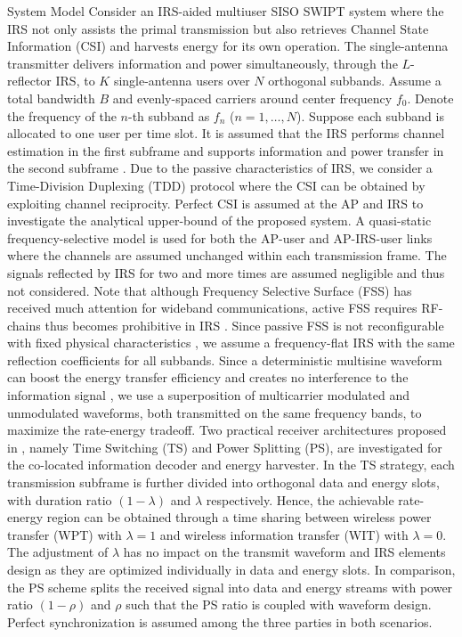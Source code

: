 \documentclass{IEEEtran}
\begin{document}
\begin{section}{System Model}
	Consider an IRS-aided multiuser SISO SWIPT system where the IRS not only assists the primal transmission but also retrieves Channel State Information (CSI) and harvests energy for its own operation. The single-antenna transmitter delivers information and power simultaneously, through the $L$-reflector IRS, to $K$ single-antenna users over $N$ orthogonal subbands. Assume a total bandwidth $B$ and evenly-spaced carriers around center frequency $f_0$. Denote the frequency of the $n$-th subband as $f_n$ ($n=1,\dots,N$). Suppose each subband is allocated to one user per time slot. It is assumed that the IRS performs channel estimation in the first subframe and supports information and power transfer in the second subframe \cite{Zheng2019}. Due to the passive characteristics of IRS, we consider a Time-Division Duplexing (TDD) protocol where the CSI can be obtained by exploiting channel reciprocity. Perfect CSI is assumed at the AP and IRS to investigate the analytical upper-bound of the proposed system. A quasi-static frequency-selective model is used for both the AP-user and AP-IRS-user links where the channels are assumed unchanged within each transmission frame. The signals reflected by IRS for two and more times are assumed negligible and thus not considered. Note that although Frequency Selective Surface (FSS) has received much attention for wideband communications, active FSS requires RF-chains thus becomes prohibitive in IRS \cite{Kim2006,Xu2014}. Since passive FSS is not reconfigurable with fixed physical characteristics \cite{Anwar2018}, we assume a frequency-flat IRS with the same reflection coefficients for all subbands. Since a deterministic multisine waveform can boost the energy transfer efficiency \cite{Clerckx2016a} and creates no interference to the information signal \cite{Clerckx2018b}, we use a superposition of multicarrier modulated and unmodulated waveforms, both transmitted on the same frequency bands, to maximize the rate-energy tradeoff. Two practical receiver architectures proposed in \cite{Zhang2013}, namely Time Switching (TS) and Power Splitting (PS), are investigated for the co-located information decoder and energy harvester. In the TS strategy, each transmission subframe is further divided into orthogonal data and energy slots, with duration ratio $(1-\lambda)$ and $\lambda$ respectively. Hence, the achievable rate-energy region can be obtained through a time sharing between wireless power transfer (WPT) with $\lambda=1$ and wireless information transfer (WIT) with $\lambda=0$. The adjustment of $\lambda$ has no impact on the transmit waveform and IRS elements design as they are optimized individually in data and energy slots. In comparison, the PS scheme splits the received signal into data and energy streams with power ratio $(1-\rho)$ and $\rho$ such that the PS ratio is coupled with waveform design. Perfect synchronization is assumed among the three parties in both scenarios.


\end{section}
\end{document}
